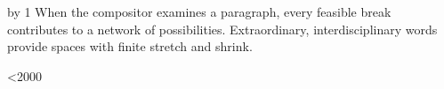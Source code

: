 
\hsize=30pc
\vsize=54pc
\parindent=18pt
\parskip=0pt
\countdef{}

\def\sampleparagraph{%
When the compositor examines a paragraph, every feasible break contributes
to a network of possibilities.  Extra\-ordinary, inter\-disciplinary words
provide spaces with finite stretch and shrink.\par}

\def\work{%
  \advance\paragraphs by 1
  \sampleparagraph
  \ifnum\paragraphs<2000 \expandafter\work\fi
}
\work
{}
\benchmarkbye
